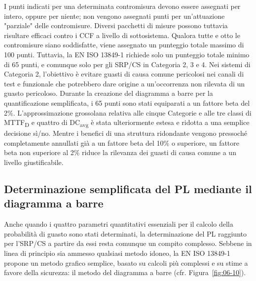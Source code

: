 I punti indicati per una determinata contromisura devono essere assegnati per intero, oppure per niente; non vengono assegnati punti per un'attuazione "parziale" delle contromisure. Diversi pacchetti di misure possono tuttavia risultare efficaci contro i CCF a livello di sottosistema. Qualora tutte e otto le contromisure siano soddisfatte, viene assegnato un punteggio totale massimo di 100 punti. Tuttavia, la EN ISO 13849-1 richiede solo un punteggio totale minimo di 65 punti, e comunque solo per gli SRP/CS in Categoria 2, 3 e 4. Nei sistemi di Categoria 2, l'obiettivo è evitare guasti di causa comune pericolosi nei canali di test e funzionale che potrebbero dare origine a un'occorrenza non rilevata di un guasto pericoloso. Durante la creazione del diagramma a barre per la quantificazione semplificata, i 65 punti sono stati equiparati a un fattore beta del 2\%. L'approssimazione grossolana relativa alle cinque Categorie e alle tre classi di MTTF\textsubscript{D} e quattro di DC\textsubscript{avg} è stata ulteriormente estesa e ridotta a una semplice decisione sì/no. Mentre i benefici di una struttura ridondante vengono pressoché completamente annullati già a un fattore beta del 10\% o superiore, un fattore beta non superiore al 2\% riduce la rilevanza dei guasti di causa comune a un livello giustificabile.

\subsection{Determinazione semplificata del PL mediante il diagramma a barre}
\label{subsec:06-2-16}
Anche quando i quattro parametri quantitativi essenziali per il calcolo della probabilità di guasto sono stati determinati, la determinazione del PL raggiunto per l'SRP/CS a partire da essi resta comunque un compito complesso. Sebbene in linea di principio sia ammesso qualsiasi metodo idoneo, la EN ISO 13849-1 propone un metodo grafico semplice, basato su calcoli più complessi e su stime a favore della sicurezza: il metodo del diagramma a barre (cfr. Figura~\ref{fig:06-10}).

\begin{center}
    \begin{minipage}{\textwidth}
        \centering
        \captionsetup{hypcap=false}
        \resizebox{0.9\textwidth}{!}{}
        \label{fig:06-10}
    \end{minipage}
\end{center}

